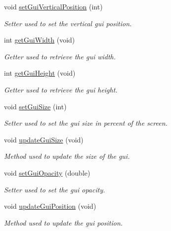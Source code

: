 \begin{DoxyCompactItemize}
void \hyperlink{class_autoscope_picture_window_form_a687966c09f4fe03caa2b52c42a804ae1}{set\+Gui\+Vertical\+Position} (int)
\begin{DoxyCompactList}\small\item\em Setter used to set the vertical gui position. \end{DoxyCompactList}\item 
int \hyperlink{class_autoscope_picture_window_form_a7e8d04d5bf4eafc415a9d6176a2325e9}{get\+Gui\+Width} (void)
\begin{DoxyCompactList}\small\item\em Getter used to retrieve the gui width. \end{DoxyCompactList}\item 
int \hyperlink{class_autoscope_picture_window_form_ad3fa8efcfcc0631f8b646500fb5cea65}{get\+Gui\+Height} (void)
\begin{DoxyCompactList}\small\item\em Getter used to retrieve the gui height. \end{DoxyCompactList}\item 
void \hyperlink{class_autoscope_picture_window_form_ae968436e14e51184ca0f375f04947d4c}{set\+Gui\+Size} (int)
\begin{DoxyCompactList}\small\item\em Setter used to set the gui size in percent of the screen. \end{DoxyCompactList}\item 
void \hyperlink{class_autoscope_picture_window_form_a8c0ca53b5ca0a741cf240a0c07870bfe}{update\+Gui\+Size} (void)
\begin{DoxyCompactList}\small\item\em Method used to update the size of the gui. \end{DoxyCompactList}\item 
void \hyperlink{class_autoscope_picture_window_form_acb47c88be96f7b6573cd6181d6e3865e}{set\+Gui\+Opacity} (double)
\begin{DoxyCompactList}\small\item\em Setter used to set the gui opacity. \end{DoxyCompactList}\item 
void \hyperlink{class_autoscope_picture_window_form_aa9b0990a5e7fa9d0bedeaab959b999c6}{update\+Gui\+Position} (void)
\begin{DoxyCompactList}\small\item\em Method used to update the gui position. \end{DoxyCompactList}\item 

\end{DoxyCompactItemize}
